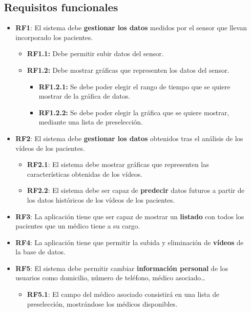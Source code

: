 \subsection{Requisitos funcionales}
\begin{itemize}
    \item \textbf{RF1}: El sistema debe \textbf{gestionar los datos} medidos por el sensor que llevan incorporado los pacientes.
    \begin{itemize}
        \item \textbf{RF1.1:} Debe permitir subir datos del sensor.
        \item \textbf{RF1.2:} Debe mostrar gráficas que representen los datos del sensor.
        \begin{itemize}
            \item \textbf{RF1.2.1:} Se debe poder elegir el rango de tiempo que se quiere mostrar de la gráfica de datos.
            \item \textbf{RF1.2.2:} Se debe poder elegir la gráfica que se quiere mostrar, mediante una lista de preselección.
        \end{itemize}
    \end{itemize}

    
    \item \textbf{RF2}: El sistema debe \textbf{gestionar los datos} obtenidos tras el análisis de los vídeos de los pacientes.
    \begin{itemize}
            \item \textbf{RF2.1}: El sistema debe mostrar gráficas que representen las características obtenidas de los vídeos.
            \item \textbf{RF2.2}: El sistema debe ser capaz de \textbf{predecir} datos futuros a partir de los datos históricos de los vídeos de los pacientes.
    \end{itemize}


    \item \textbf{RF3}: La aplicación tiene que ser capaz de mostrar un \textbf{listado} con todos los pacientes que un médico tiene a su cargo.


    \item \textbf{RF4}: La aplicación tiene que permitir la subida y eliminación de \textbf{vídeos} de la base de datos.


    \item \textbf{RF5}: El sistema debe permitir cambiar \textbf{información personal} de los usuarios como domicilio, número de teléfono, médico asociado\ldots
    \begin{itemize}
            \item \textbf{RF5.1}: El campo del médico asociado consistirá en una lista de preselección, mostrándose los médicos disponibles.
    \end{itemize}


\end{itemize}
